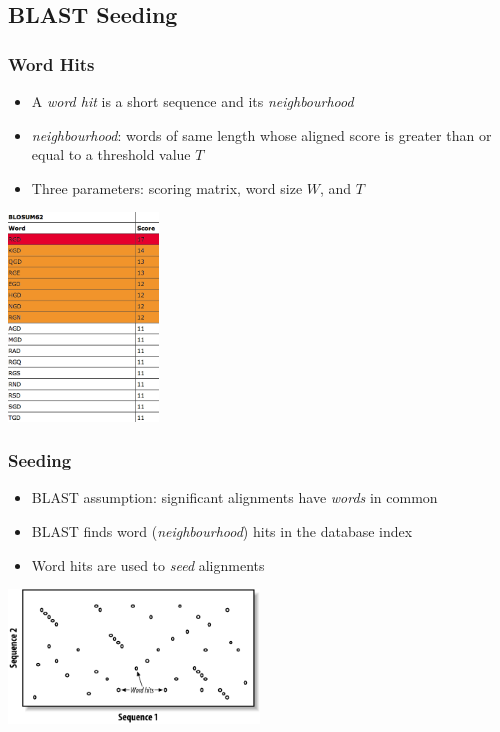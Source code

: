 %

\subsection{BLAST Seeding}
\begin{frame}
  \frametitle{Word Hits}
  \begin{itemize}
    \item A \emph{word hit} is a short sequence and its \emph{neighbourhood}
    \item \emph{neighbourhood}: words of same length whose aligned score is greater than or equal to a threshold value $T$
    \item Three parameters: scoring matrix, word size $W$, and $T$
  \end{itemize}
  \begin{center}
    \includegraphics[width=0.3\textwidth]{images/neighbourhood} 
  \end{center}    
\end{frame}

\begin{frame}
  \frametitle{Seeding}
  \begin{itemize}
    \item BLAST assumption: significant alignments have \emph{words} in common
    \item BLAST finds word (\emph{neighbourhood}) hits in the database index
    \item Word hits are used to \textit{seed} alignments
  \end{itemize}
  \begin{center}
    \includegraphics[width=0.5\textwidth]{images/seeding} 
  \end{center}    
\end{frame}

